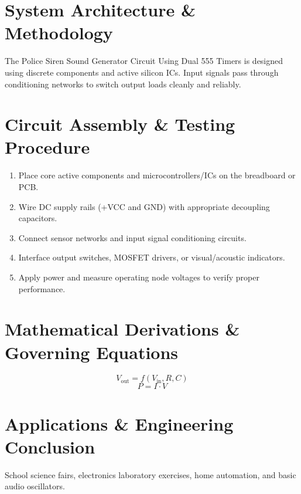 \documentclass[11pt,a4paper]{article}
\begin{document}
\section{System Architecture \& Methodology}
The Police Siren Sound Generator Circuit Using Dual 555 Timers is designed using discrete components and active silicon ICs. Input signals pass through conditioning networks to switch output loads cleanly and reliably.

\section{Circuit Assembly \& Testing Procedure}
\begin{enumerate}
    \item Place core active components and microcontrollers/ICs on the breadboard or PCB.
    \item Wire DC supply rails (+VCC and GND) with appropriate decoupling capacitors.
    \item Connect sensor networks and input signal conditioning circuits.
    \item Interface output switches, MOSFET drivers, or visual/acoustic indicators.
    \item Apply power and measure operating node voltages to verify proper performance.
\end{enumerate}

\section{Mathematical Derivations \& Governing Equations}
\begin{equation}
V_{\text{out}} = f(V_{\text{in}}, R, C)
\end{equation}
\begin{equation}
P = I \cdot V
\end{equation}

\section{Applications \& Engineering Conclusion}
School science fairs, electronics laboratory exercises, home automation, and basic audio oscillators.
\end{document}
